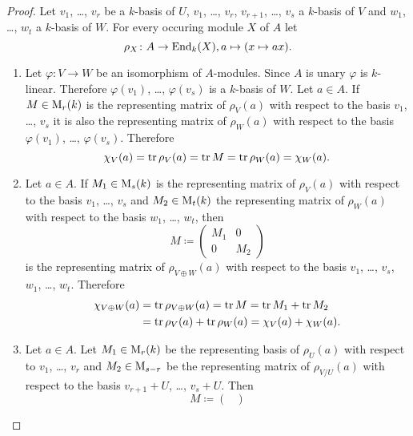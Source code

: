 \begin{proof}
  Let $v_1$, \dots, $v_r$ be a $k$-basis of $U$, $v_1$, \dots, $v_r$, $v_{r+1}$, \dots, $v_s$ a $k$-basis of $V$ and $w_1$, \dots, $w_t$ a $k$-basis of $W$.
  For every occuring module $X$ of $A$ let
  \[
            \rho_X
    \colon  A
    \to     \operatorname{End}_k(X),
            a
    \mapsto (x \mapsto ax).
  \]
  \begin{enumerate}[label=\emph{\alph*)},leftmargin=*]
    \item
      Let $\varphi \colon V \to W$ be an isomorphism of $A$-modules.
      Since $A$ is unary $\varphi$ is $k$-linear.
      Therefore $\varphi(v_1)$, \dots, $\varphi(v_s)$ is a $k$-basis of $W$.
      Let $a \in A$.
      If $M \in \operatorname{M}_r(k)$ is the representing matrix of $\rho_V(a)$ with respect to the basis $v_1$, \dots, $v_s$ it is also the representing matrix of $\rho_W(a)$ with respect to the basis $\varphi(v_1)$, \dots, $\varphi(v_s)$.
      Therefore
      \[
          \chi_V(a)
        = \operatorname{tr} \rho_V(a)
        = \operatorname{tr} M
        = \operatorname{tr} \rho_W(a)
        = \chi_W(a).
      \]
    \item
      Let $a \in A$.
      If $M_1 \in \operatorname{M}_s(k)$ is the representing matrix of $\rho_V(a)$ with respect to the basis $v_1$, \dots, $v_s$ and $M_2 \in \operatorname{M}_t(k)$ the representing matrix of $\rho_W(a)$ with respect to the basis $w_1$, \dots, $w_t$, then
      \[
                  M
        \coloneqq \begin{pmatrix}
                    M_1 & 0 \\
                    0 & M_2
                  \end{pmatrix}
      \]
      is the representing matrix of $\rho_{V \oplus W}(a)$ with respect to the basis $v_1$, \dots, $v_s$, $w_1$, \dots, $w_t$.
      Therefore
      \begin{align*}
            \chi_{V \oplus W}(a)
        &=  \operatorname{tr} \rho_{V \oplus W}(a)
         =  \operatorname{tr} M
         =  \operatorname{tr} M_1 + \operatorname{tr} M_2 \\
        &=  \operatorname{tr} \rho_V(a) + \operatorname{tr} \rho_W(a)
         =  \chi_V(a) + \chi_W(a).
      \end{align*}
    \item
      Let $a \in A$.
      Let $M_1 \in \operatorname{M}_r(k)$ be the representing basis of $\rho_U(a)$ with respect to $v_1$, \dots, $v_r$ and $M_2 \in \operatorname{M}_{s-r}$ be the representing matrix of $\rho_{V/U}(a)$ with respect to the basis $v_{r+1} + U$, \dots, $v_s + U$.
      Then
      \[
                  M
        \coloneqq \begin{pmatrix}

\end{pmatrix}\]
\end{enumerate}
\end{proof}

